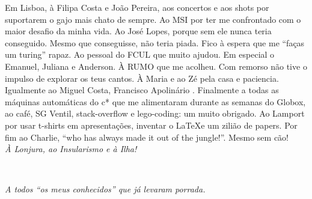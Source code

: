 
Em Lisboa, à Filipa Costa e João Pereira, aos concertos e aos shots por suportarem o gajo mais chato de sempre. 
Ao MSI por ter me confrontado  com o maior desafio da minha vida. 
Ao José Lopes, porque sem ele nunca teria conseguido. Mesmo que conseguisse, não teria piada. Fico à espera que me ``faças um turing'' rapaz. 
Ao pessoal do FCUL que muito ajudou. Em especial o Emanuel, Juliana e Anderson. 
À RUMO que me acolheu. Com remorso não tive o impulso de explorar os teus cantos. 
À Maria e ao Zé pela casa e paciencia. Igualmente ao Miguel Costa, Francisco Apolinário . 
Finalmente a todas as máquinas automáticas do c* que me alimentaram durante as semanas do Globox, ao café, SG Ventil, stack-overflow e lego-coding: um muito obrigado. Ao Lamport por usar t-shirts em apresentações, inventar o \LaTeX e um zilião de papers. 
Por fim ao Charlie, ``who has always made it out of the jungle!''. Mesmo sem cão!\\ 

\emph{À Lonjura, ao Insularismo e  à Ilha!} \\



\LIMPA
\LIMPA

~
\vfill

\begin{flushright}\textit{A todos ``os meus conhecidos''  que já levaram porrada. }\end{flushright}

\LIMPA

